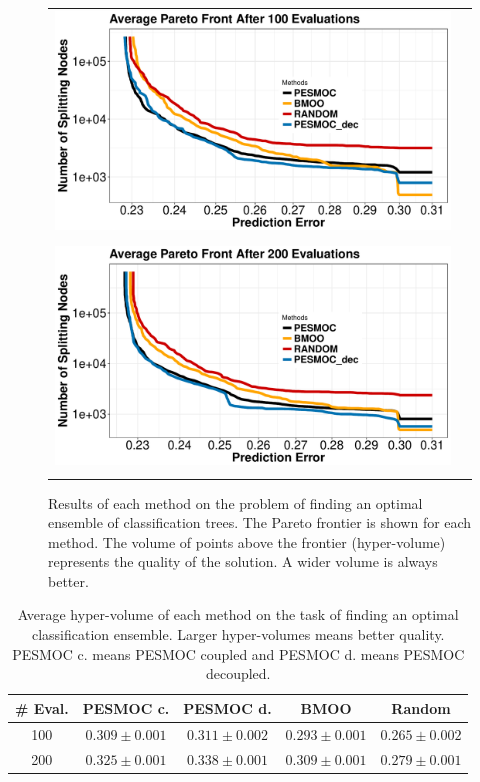 \begin{figure}[H]
\begin{center}
        \begin{tabular}{cc}
                \vspace{-.2cm}
                \includegraphics[width=0.75\linewidth]{Figures/pesmoc/real/100_ensemble.pdf} \\ \\
                \includegraphics[width=0.75\linewidth]{Figures/pesmoc/real/200_ensemble.pdf} \\
                \vspace{-.1cm}
        \end{tabular}
        \caption{Results of each method on the problem of finding an optimal ensemble of classification trees.
                The Pareto frontier is shown for each method. The volume of points above the frontier
                (hyper-volume) represents the quality of the solution. A wider volume is always better.}
        \label{fig:ensemble_results}
\end{center}
\end{figure}

\begin{table}[htb]
\small
\centering
\caption{Average hyper-volume of each method on the task of finding an optimal classification
        ensemble. Larger hyper-volumes means better quality. PESMOC c. means PESMOC coupled and PESMOC d. means
PESMOC decoupled.}
\begin{tabular}{ c c c c c}
 \hline
\textbf{\# Eval.} & \textbf{PESMOC c.} & \textbf{PESMOC d.} & \textbf{BMOO} & \textbf{Random} \\
\hline
100 & $ 0.309  \pm  0.001 $ & $\mathbf{ 0.311 \pm  0.002 }$ & $ 0.293 \pm  0.001$ & $ 0.265 \pm  0.002 $ \\
\hline
200 & $ 0.325 \pm  0.001 $ & $\mathbf{ 0.338 \pm  0.001 }$ & $ 0.309 \pm  0.001 $ & $ 0.279 \pm  0.001$ \\
\hline
\end{tabular}
\label{table:hyper_ensemble}
\end{table}

